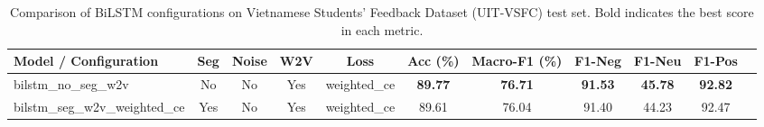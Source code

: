 \begin{table}[t]
\centering
\small
\begin{tabular}{l ccccc ccccc}
\toprule
\textbf{Model / Configuration} & \textbf{Seg} & \textbf{Noise} & \textbf{W2V} & \textbf{Loss} & \textbf{Acc (\%)} & \textbf{Macro-F1 (\%)} & \textbf{F1-Neg} & \textbf{F1-Neu} & \textbf{F1-Pos} \\
\midrule
bilstm\_no\_seg\_w2v & No & No & Yes & weighted\_ce & \textbf{89.77} & \textbf{76.71} & \textbf{91.53} & \textbf{45.78} & \textbf{92.82} \\
bilstm\_seg\_w2v\_weighted\_ce & Yes & No & Yes & weighted\_ce & 89.61 & 76.04 & 91.40 & 44.23 & 92.47 \\
\bottomrule
\end{tabular}
\caption{Comparison of BiLSTM configurations on Vietnamese Students' Feedback Dataset (UIT-VSFC) test set. Bold indicates the best score in each metric.}
\label{tab:bilstm_results}
\end{table}
